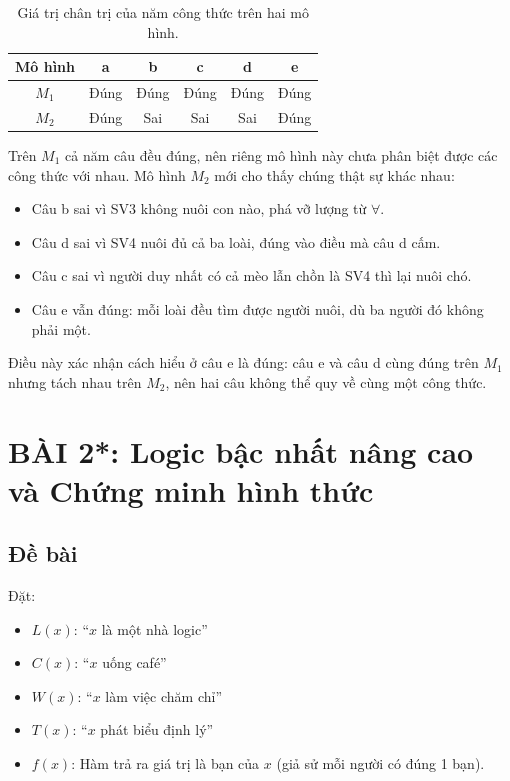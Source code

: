 \documentclass[12pt,a4paper]{article}
\begin{document}
\begin{table}[h!]
\centering
\begin{tabular}{|c|c|c|c|c|c|}
\hline
\textbf{Mô hình} & \textbf{a} & \textbf{b} & \textbf{c} & \textbf{d} & \textbf{e} \\
\hline
$M_1$ & Đúng & Đúng & Đúng & Đúng & Đúng \\
$M_2$ & Đúng & Sai & Sai & Sai & Đúng \\
\hline
\end{tabular}
\caption{Giá trị chân trị của năm công thức trên hai mô hình.}
\end{table}

Trên $M_1$ cả năm câu đều đúng, nên riêng mô hình này chưa phân biệt được các công thức với nhau. Mô hình $M_2$ mới cho thấy chúng thật sự khác nhau:
\begin{itemize}
    \item Câu b sai vì SV3 không nuôi con nào, phá vỡ lượng từ $\forall$.
    \item Câu d sai vì SV4 nuôi đủ cả ba loài, đúng vào điều mà câu d cấm.
    \item Câu c sai vì người duy nhất có cả mèo lẫn chồn là SV4 thì lại nuôi chó.
    \item Câu e vẫn đúng: mỗi loài đều tìm được người nuôi, dù ba người đó không phải một.
\end{itemize}
Điều này xác nhận cách hiểu ở câu e là đúng: câu e và câu d cùng đúng trên $M_1$ nhưng tách nhau trên $M_2$, nên hai câu không thể quy về cùng một công thức.

\newpage
\section{BÀI 2*: Logic bậc nhất nâng cao và Chứng minh hình thức}

\subsection{Đề bài}
Đặt:
\begin{itemize}
    \item $L(x)$: ``$x$ là một nhà logic''
    \item $C(x)$: ``$x$ uống café''
    \item $W(x)$: ``$x$ làm việc chăm chỉ''
    \item $T(x)$: ``$x$ phát biểu định lý''
    \item $f(x)$: Hàm trả ra giá trị là bạn của $x$ (giả sử mỗi người có đúng 1 bạn).
\end{itemize}
\end{document}

